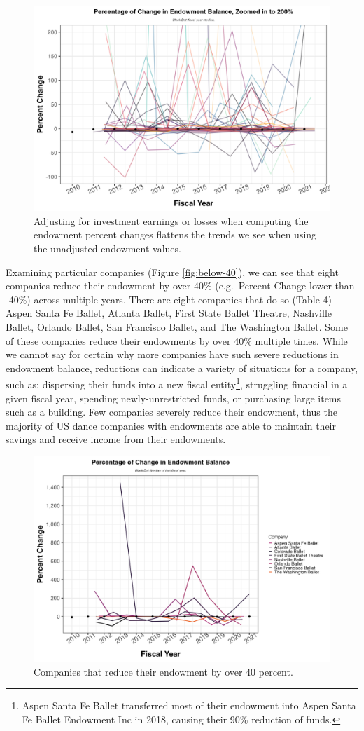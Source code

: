 \documentclass[Dance Data
Project,article,submit,moreauthors,pdftex]{mdpi}
\begin{document}
\begin{figure}[H]
\includegraphics[width=0.8\linewidth,]{../images/pc_endow_flat} \caption{\label{fig:flat} Adjusting for investment earnings or losses when computing the endowment percent changes flattens the trends we see when using the unadjusted endowment values.}\label{fig:flat}
\end{figure}

Examining particular companies (Figure \ref{fig:below-40}), we can see
that eight companies reduce their endowment by over 40\% (e.g.~Percent
Change lower than -40\%) across multiple years. There are eight
companies that do so (Table 4) Aspen Santa Fe Ballet, Atlanta Ballet,
First State Ballet Theatre, Nashville Ballet, Orlando Ballet, San
Francisco Ballet, and The Washington Ballet. Some of these companies
reduce their endowments by over 40\% multiple times. While we cannot say
for certain why more companies have such severe reductions in endowment
balance, reductions can indicate a variety of situations for a company,
such as: dispersing their funds into a new fiscal entity\footnote{Aspen
  Santa Fe Ballet transferred most of their endowment into Aspen Santa
  Fe Ballet Endowment Inc in 2018, causing their 90\% reduction of
  funds.}, struggling financial in a given fiscal year, spending
newly-unrestricted funds, or purchasing large items such as a building.
Few companies severely reduce their endowment, thus the majority of US
dance companies with endowments are able to maintain their savings and
receive income from their endowments.

\begin{figure}[H]
\includegraphics[width=0.8\linewidth,]{../images/pc_below_40} \caption{\label{fig:below-40} Companies that reduce their endowment by over 40 percent.}\label{fig:unnamed-chunk-8}
\end{figure}
\end{document}

